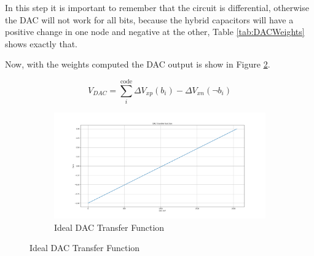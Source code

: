 In this step it is important to remember that the circuit is differential, otherwise the DAC will not work for all bits, because the hybrid capacitors will have a positive change in one node and negative at the other, Table \ref{tab:DACWeights} shows exactly that. 

Now, with the weights computed the DAC output is show in Figure \ref{fig:DAC_TF}.

\begin{equation}
    V_{DAC} = \sum_{i}^{\text{code}}\Delta V_{xp}(b_i)- \Delta V_{xn}(\neg b_i)
    \label{eq:VDAC}
\end{equation}

\begin{figure}[h]
    \centering

    \begin{subfigure}[b]{0.9\textwidth}
        \centering
        \includegraphics[width=\textwidth]{Images/DAC_TransFunc_ideal.png}
        \caption{Ideal DAC Transfer Function}
        \label{fig:DAC_TF}
    \end{subfigure}%


\end{figure}
